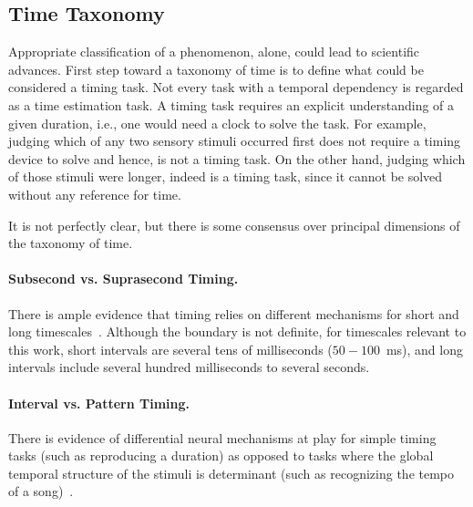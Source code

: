 \subsection[Time Taxonomy]{Time Taxonomy} \label{ch:intro:taxonomy}
Appropriate classification of a phenomenon, alone, could lead to scientific advances.\footnotemark
{}
First step toward a taxonomy of time is to define what could be considered a timing task.
Not every task with a temporal dependency is regarded as a time estimation task.
A timing task requires an explicit understanding of a given duration, i.e., one would need a clock to solve the task.
For example, judging which of any two sensory stimuli occurred first does not require a timing device to solve and hence, is not a timing task.
On the other hand, judging which of those stimuli were longer, indeed is a timing task, since it cannot be solved without any reference for time.
\par
It is not perfectly clear, but there is some consensus over principal dimensions of the taxonomy of time.

\paragraph{Subsecond vs. Suprasecond Timing.} \label{ch:intro:taxonomy:SUBvsSUPRA}
There is ample evidence that timing relies on different mechanisms for short and long timescales~\cite[see][]{Paton2018NeuronRev}.
Although the boundary is not definite, for timescales relevant to this work, short intervals are several tens of milliseconds ($50-100$~ms), and long intervals include several hundred milliseconds to several seconds.

\paragraph{Interval vs. Pattern Timing.} \label{ch:intro:taxonomy:INTvsPAT}
There is evidence of differential neural mechanisms at play for simple timing tasks (such as reproducing a duration) as  opposed to tasks where the global temporal structure of the stimuli is determinant (such as recognizing the tempo of a song)~\cite{teki2011}.

